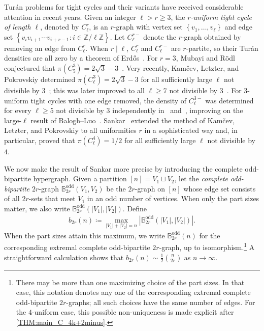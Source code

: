 \documentclass[10pt,a4paper]{article}
\theoremstyle{plain}
\theoremstyle{definition}
\begin{document}
Tur\'{a}n problems for tight cycles and their variants have received considerable attention in recent years.   
Given an integer $\ell > r \ge 3$, the \emph{$r$-uniform tight cycle of length $\ell$}, denoted by $C_{\ell}^{r}$, is an $r$-graph with vertex set $\left\{v_1,\ldots,v_{\ell}\right\}$ and edge set $\left\{v_i v_{i+1} \cdots v_{i+r-1}\colon i\in \mathbb{Z}/ \ell \mathbb{Z}\right\}$. 
Let $C_{\ell}^{r-}$ denote the $r$-graph obtained by removing an edge from $C_{\ell}^{r}$. 
When $r \mid \ell$, $C_{\ell}^{r}$ and $C_{\ell}^{r-}$ are $r$-partite, so their Tur\'{a}n densities are all zero by a theorem of Erd\H{o}s~\cite{Erdos67a}. 
For $r=3$, Mubayi and R\"{o}dl conjectured that $\pi(C_{5}^{3})=2\sqrt{3}-3$~\cite{MPS11,MR02}.
Very recently, Kam\v{c}ev, Letzter, and Pokrovskiy determined $\pi(C_{\ell}^{3})=2\sqrt{3}-3$ for all sufficiently large $\ell$ not divisible by $3$~\cite{KLP24}; this was later improved to all $\ell \ge 7$ not divisible by $3$~\cite{BLLP24}. 
For $3$-uniform tight cycles with one edge removed, the density of $C_{\ell}^{3-}$ was determined for every $\ell \ge 5$ not divisible by $3$ independently in~\cite{LMP24} and~\cite{BLLP24}, improving on the large-$\ell$ result of Balogh--Luo~\cite{BL24}.
Sankar~\cite{San26} extended the method of Kam\v{c}ev, Letzter, and Pokrovskiy to all uniformities $r$ in a sophisticated way and, in particular, proved that $\pi(C_{\ell}^{4})=1/2$ for all sufficiently large $\ell$ not divisible by $4$. 

We now make the result of Sankar more precise by introducing the complete odd-bipartite hypergraph.
Given a partition $[n]=V_1\sqcup V_2$, let the \emph{complete odd-bipartite} $2r$-graph $\mathbb{B}_{2r}^{\mathrm{odd}}(V_1,V_2)$ be the $2r$-graph on $[n]$ whose edge set consists of all $2r$-sets that meet $V_1$ in an odd number of vertices.  When only the part sizes matter, we also write $\mathbb{B}_{2r}^{\mathrm{odd}}(|V_1|,|V_2|)$.  Define
\begin{align*}
b_{2r}(n) \coloneqq \max_{|V_1|+|V_2|=n}\left|\mathbb{B}_{2r}^{\mathrm{odd}}(|V_1|,|V_2|)\right|. 
\end{align*}
When the part sizes attain this maximum, we write $\mathbb{B}_{2r}^{\mathrm{odd}}(n)$ for the corresponding extremal complete odd-bipartite $2r$-graph, up to isomorphism.\footnote{There may be more than one maximizing choice of the part sizes.  In that case, this notation denotes any one of the corresponding extremal complete odd-bipartite $2r$-graphs; all such choices have the same number of edges.  For the $4$-uniform case, this possible non-uniqueness is made explicit after \cref{THM:main_C_4k+2minus}.}  A straightforward calculation shows that $b_{2r}(n) \sim \frac{1}{2}\binom{n}{2r}$ as $n \to \infty$. 
\end{document}
